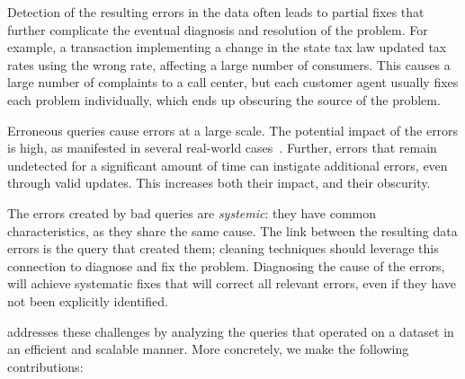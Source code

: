 \begin{description}[leftmargin=*, topsep=0mm, itemsep=0mm]
    
    \item[Obscurity.] Detection of the resulting errors in the data often
    leads to partial fixes that further complicate the eventual diagnosis and
    resolution of the problem. For example, a transaction implementing a
    change in the state tax law updated tax rates using the wrong rate,
    affecting a large number of consumers. This causes a large number of
    complaints to a call center, but each customer agent usually fixes each
    problem individually, which ends up obscuring the source of the problem.
    
    \item[Large impact.] Erroneous queries cause errors at a large scale. The
    potential impact of the errors is high, as manifested in several
    real-world cases~\cite{Yates10, Grady13, sakalerrors}. Further, errors
    that remain undetected for a significant amount of time can instigate
    additional errors, even through valid updates. This increases both their
    impact, and their obscurity.
    
    \item[Systemic errors.] The errors created by bad queries are
    \emph{systemic}: they have common characteristics, as they share the same
    cause. The link between the resulting data errors is the query that
    created them; cleaning techniques should leverage this connection to
    diagnose and fix the problem. Diagnosing the cause of the errors, will
    achieve systematic fixes that will correct all relevant errors, even if
    they have not been explicitly identified.
    
\end{description}
% 
\sys addresses these challenges by analyzing the queries that operated on a
dataset in an efficient and scalable manner. More concretely, we make the
following contributions:





